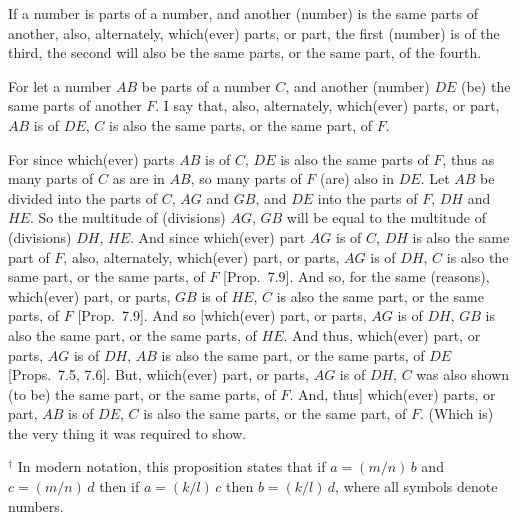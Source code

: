 \begin{Parallel}{}{}
{If a number is parts of a number, and another (number) is the same parts of another, also, alternately, which(ever) parts, or part, 
the first (number) is of the third, the second will also be the same
parts, or the same part, of the fourth.

For let a number $AB$ be parts of a number $C$, and another (number)
$DE$ (be) the same parts of another $F$. I say that, also, alternately, which(ever)
parts, or part, $AB$ is of $DE$, $C$ is also the same parts, or the same part,
of $F$.

\epsfysize=2in
\centerline{}

For since which(ever) parts $AB$ is of $C$, $DE$ is also the same parts of $F$,
thus as many parts of $C$ as are in $AB$, so many parts of $F$ (are)
also in $DE$. Let $AB$ be divided into the parts of $C$, $AG$ and $GB$, and
$DE$ into the parts of $F$, $DH$ and $HE$.  So the multitude of
(divisions) $AG$, $GB$ will be equal to the multitude of (divisions) $DH$, $HE$.
And since which(ever) part $AG$ is of $C$, $DH$ is also the same part of $F$,
also, alternately, which(ever) part, or parts, $AG$ is
of $DH$, $C$ is also the same part, or the same parts, of $F$  [Prop.~7.9]. And so, for the same (reasons), 
which(ever) part, or parts, $GB$ is of $HE$, $C$ is also the same
part, or the same parts, of $F$ [Prop.~7.9]. And so [which(ever) part, or parts, $AG$ is of
$DH$, $GB$ is also the same part, or the same parts, of $HE$. And thus,
which(ever) part, or parts, $AG$ is of $DH$, $AB$ is also the same part, or the
same parts, of $DE$ [Props.~7.5, 7.6]. But, which(ever) part, or parts, $AG$ is of $DH$, $C$ was also
shown (to be) the same part, or the same parts, of $F$. And, thus] which(ever)
parts, or part, $AB$ is of $DE$, $C$ is also the  same parts, or the same part, of $F$. (Which
is) the very thing it was required to show.}
\end{Parallel}
{\footnotesize\noindent$^\dag$ In modern notation, this
proposition states that if $a=(m/n)\,b$ and $c=(m/n)\,d$ then if $a=(k/l)\,c$
then $b = (k/l)\,d$, where all symbols denote numbers.}

